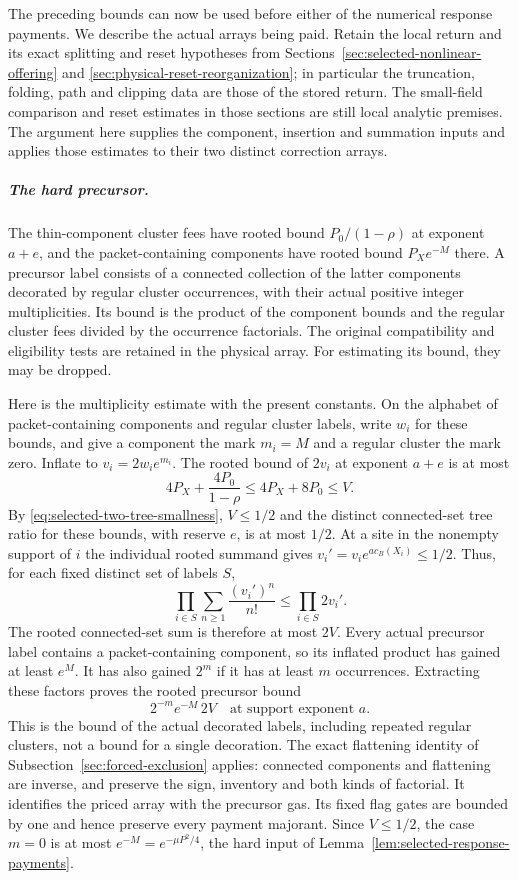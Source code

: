 The preceding bounds can now be used before either of the numerical
response payments. We describe the actual arrays being paid. Retain
the local return and its exact splitting and reset hypotheses from
Sections~\ref{sec:selected-nonlinear-offering} and
\ref{sec:physical-reset-reorganization}; in particular the truncation,
folding, path and clipping data are those of the stored return.
The small-field comparison and reset estimates in those sections are
still local analytic premises. The argument here supplies the
component, insertion and summation inputs and applies those estimates
to their two distinct correction arrays.

\subparagraph{The hard precursor.}
The thin-component cluster fees have rooted bound
$P_0/(1-\rho)$ at exponent $a+e$, and the packet-containing components
have rooted bound $P_Xe^{-M}$ there. A precursor label consists of a
connected collection of the latter components decorated by regular
cluster occurrences, with their actual positive integer multiplicities.
Its bound is the product of the component bounds and the regular
cluster fees divided by the occurrence factorials. The original
compatibility and eligibility tests are retained in the physical
array. For estimating its bound, they may be dropped.

Here is the multiplicity estimate with the present constants. On the
alphabet of packet-containing components and regular cluster labels,
write $w_i$ for these bounds, and give a component the mark $m_i=M$
and a regular cluster the mark zero. Inflate to $v_i=2w_i e^{m_i}$.
The rooted bound of $2v_i$ at exponent $a+e$ is at most
\[
 4P_X+\frac{4P_0}{1-\rho}\le4P_X+8P_0\le V.
\]
By \eqref{eq:selected-two-tree-smallness}, $V\le1/2$ and the
distinct connected-set tree ratio for these bounds, with reserve $e$,
is at most $1/2$. At a site in the nonempty support of $i$ the
individual rooted summand gives
$v_i'=v_i e^{a c_B(X_i)}\le1/2$. Thus, for each fixed distinct
set of labels $S$,
\[
 \prod_{i\in S}\sum_{n\ge1}\frac{(v_i')^n}{n!}
       \le\prod_{i\in S}2v_i'.
\]
The rooted connected-set sum is therefore at most $2V$.
Every actual precursor label contains a packet-containing component,
so its inflated product has gained at least $e^M$. It has also gained
$2^m$ if it has at least $m$ occurrences. Extracting these factors
proves the rooted precursor bound
\begin{equation}\label{eq:selected-precursor-hard}
                 2^{-m}e^{-M}\,2V
                     \quad\text{at support exponent }a.
\end{equation}
This is the bound of the actual decorated labels, including repeated
regular clusters, not a bound for a single decoration. The exact
flattening identity of Subsection~\ref{sec:forced-exclusion} applies:
connected components and flattening are inverse, and preserve the
sign, inventory and both kinds of factorial. It identifies the
priced array with the precursor gas. Its fixed flag gates are bounded
by one and hence preserve every payment majorant. Since $V\le1/2$,
the case $m=0$ is at most $e^{-M}=e^{-\mu P^2/4}$, the hard input
of Lemma~\ref{lem:selected-response-payments}.

